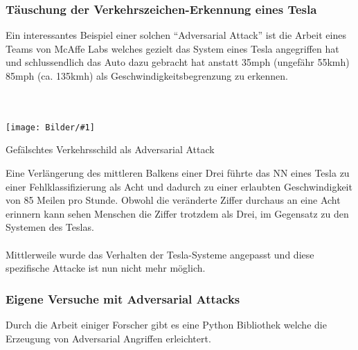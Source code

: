 \documentclass[
  12pt, %
  a4paper, %
  oneside, %
  openany, 
  numbers=noenddot, %
  BCOR=5mm, %
  parskip=half*, %
  thesis, %
]{bfhbook}
\newcommand{\imgText}[3]{
\begin{center}
    \begin{minipage}[t]{0.6\textwidth}
    		\vspace{0pt}
		\texttt{[image: Bilder/\#1]}
		\caption{#2}
	\end{minipage}\hfill
    \begin{minipage}[t]{0.4\textwidth}
    		\vspace{20pt}
  		#3
    \end{minipage}
\end{center}
}
\begin{document}
\subsubsection*{Täuschung der Verkehrszeichen-Erkennung eines Tesla}
Ein interessantes Beispiel einer solchen ``Adversarial Attack'' ist die Arbeit eines Teams von McAffe Labs welches gezielt das System eines Tesla angegriffen hat und schlussendlich das Auto dazu gebracht hat anstatt 35mph (ungefähr 55kmh)  85mph (ca. 135kmh) als Geschwindigkeitsbegrenzung zu erkennen.\\
\\
\parencite{advTesla} 
\\
\imgText{speed-limit-fake.png}{Gefälschtes Verkehrsschild als Adversarial Attack}{
Eine Verlängerung des mittleren Balkens einer Drei führte das \Gls{NN} eines Tesla zu einer Fehlklassifizierung als Acht und dadurch zu einer erlaubten Geschwindigkeit von 85 Meilen pro Stunde. Obwohl die veränderte Ziffer durchaus an eine Acht erinnern kann sehen Menschen die Ziffer trotzdem als Drei, im Gegensatz zu den Systemen des Teslas.
\\
\\
Mittlerweile wurde das Verhalten der Tesla-Systeme angepasst und diese spezifische Attacke ist nun nicht mehr möglich.
}

\subsubsection*{Eigene Versuche mit Adversarial Attacks}
Durch die Arbeit einiger Forscher \parencite{papernot2018cleverhans} gibt es eine Python Bibliothek \parencite{cleverHans} welche die Erzeugung von Adversarial Angriffen erleichtert.
\end{document}
